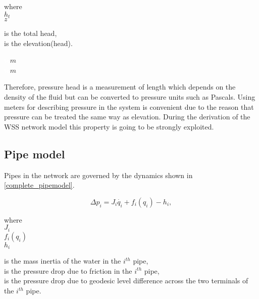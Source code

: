 \begin{minipage}[t]{0.20\textwidth}
where\\
\hspace*{8mm} $h_t$ \\
\hspace*{8mm} $z$ 
\end{minipage}
\begin{minipage}[t]{0.68\textwidth}
\vspace*{2mm}
is the total head,\\
is the elevation(head).
\end{minipage}
\begin{minipage}[t]{0.10\textwidth}
\vspace*{2mm}
\textcolor{White}{te}$\unit{m}$\\
\textcolor{White}{te}$\unit{m}$
\end{minipage}

Therefore, pressure head is a measurement of length which depends on the density of the fluid but can be converted to pressure units such as Pascals. Using meters for describing pressure in the system is convenient due to the reason that pressure can be treated the same way as elevation. During the derivation of the WSS network model this property is going to be strongly exploited. 

\subsection{Pipe model}
\label{pipe_component}

Pipes in the network are governed by the dynamics shown in \eqref{complete_pipemodel}.

\begin{equation}
\label{complete_pipemodel}
  \Delta p_i = J_i \dot{q_i} + f_i(q_i) - h_i,
\end{equation}

 \begin{minipage}[t]{0.20\textwidth}
where\\
\hspace*{8mm} $J_i$ \\
\hspace*{8mm} $f_i(q_i)$ \\
\hspace*{8mm} $ h_i$ 
\end{minipage}
\begin{minipage}[t]{0.68\textwidth}
\vspace*{2mm}
is the mass inertia of the water in the $i^{th}$ pipe,\\ 
is the pressure drop due to friction in the $i^{th}$ pipe,\\
is the pressure drop due to geodesic level difference across the two terminals of the $i^{th}$ pipe.
\end{minipage}

